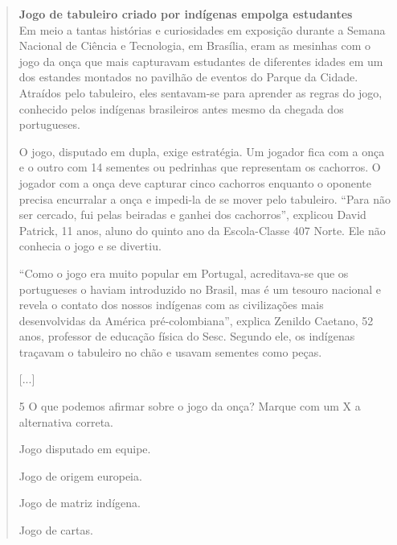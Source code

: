\begin{escolha}
\begin{quote}
\textbf{Jogo de tabuleiro criado por indígenas empolga estudantes}\\
Em meio a tantas histórias e curiosidades em exposição durante a Semana
Nacional de Ciência e Tecnologia, em Brasília, eram as mesinhas com o
jogo da onça que mais capturavam estudantes de diferentes idades em um
dos estandes montados no pavilhão de eventos do Parque da Cidade.
Atraídos pelo tabuleiro, eles sentavam-se para aprender as regras do
jogo, conhecido pelos indígenas brasileiros antes mesmo da chegada dos
portugueses.

O jogo, disputado em dupla, exige estratégia. Um jogador fica com a onça
e o outro com 14 sementes ou pedrinhas que representam os cachorros. O
jogador com a onça deve capturar cinco cachorros enquanto o oponente
precisa encurralar a onça e impedi-la de se mover pelo tabuleiro. ``Para
não ser cercado, fui pelas beiradas e ganhei dos cachorros'', explicou
David Patrick, 11 anos, aluno do quinto ano da Escola-Classe 407 Norte.
Ele não conhecia o jogo e se divertiu.

``Como o jogo era muito popular em Portugal, acreditava-se que os
portugueses o haviam introduzido no Brasil, mas é um tesouro nacional e
revela o contato dos nossos indígenas com as civilizações mais
desenvolvidas da América pré-colombiana'', explica Zenildo Caetano, 52
anos, professor de educação física do Sesc. Segundo ele, os indígenas
traçavam o tabuleiro no chão e usavam sementes como peças.

{[}...{]}


\num{5} O que podemos afirmar sobre o jogo da onça? Marque com um X a alternativa correta.

\begin{boxlist}
 Jogo disputado em equipe.

 Jogo de origem europeia.

 Jogo de matriz indígena.

 Jogo de cartas.
\end{boxlist}




\end{quote}
\end{escolha}
